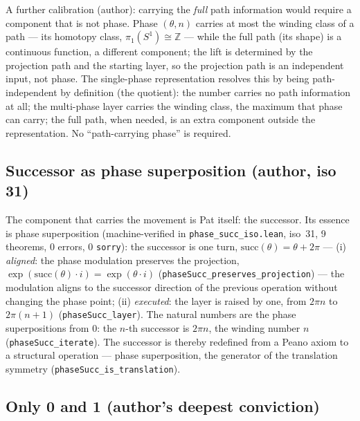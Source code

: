 \documentclass{article}
\begin{document}
A further calibration (author): carrying the \emph{full} path
information would require a component that is not phase. Phase
$(\theta,n)$ carries at most the winding class of a path --- its
homotopy class, $\pi_1(S^1)\cong\mathbb Z$ --- while the full path (its
shape) is a continuous function, a different component; the lift is
determined by the projection path and the starting layer, so the
projection path is an independent input, not phase. The single-phase
representation resolves this by being path-independent by definition
(the quotient): the number carries no path information at all; the
multi-phase layer carries the winding class, the maximum that phase can
carry; the full path, when needed, is an extra component outside the
representation. No ``path-carrying phase'' is required.

\subsection*{Successor as phase superposition (author, iso 31)}

The component that carries the movement is Pat itself: the successor.
Its essence is phase superposition (machine-verified in
\texttt{phase\_succ\_iso.lean}, iso~31, 9 theorems, 0 errors, 0
\texttt{sorry}): the successor is one turn,
$\mathrm{succ}(\theta)=\theta+2\pi$ --- (i) \emph{aligned}: the phase
modulation preserves the projection,
$\exp(\mathrm{succ}(\theta)\cdot i)=\exp(\theta\cdot i)$
(\texttt{phaseSucc\_preserves\_projection}) --- the modulation aligns to
the successor direction of the previous operation without changing the
phase point; (ii) \emph{executed}: the layer is raised by one, from
$2\pi n$ to $2\pi(n+1)$ (\texttt{phaseSucc\_layer}). The natural numbers
are the phase superpositions from $0$: the $n$-th successor is $2\pi n$,
the winding number $n$ (\texttt{phaseSucc\_iterate}). The successor is
thereby redefined from a Peano axiom to a structural operation --- phase
superposition, the generator of the translation symmetry
(\texttt{phaseSucc\_is\_translation}).

\subsection*{Only 0 and 1 (author's deepest conviction)}
\end{document}
